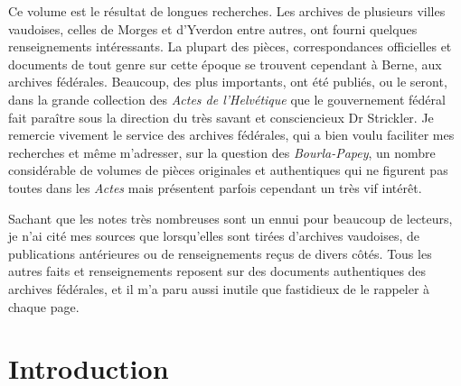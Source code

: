 \documentclass[french,twoside]{book} %
\newcommand\chapteropen{} %
\newcommand\chapterclose{} %
\begin{document}
Ce volume est le résultat de longues recherches. Les archives de plusieurs villes vaudoises, celles de Morges et d’Yverdon entre autres, ont fourni quelques renseignements intéressants. La plupart des pièces, correspondances officielles et documents de tout genre sur cette époque se trouvent cependant à Berne, aux archives fédérales. Beaucoup, des plus importants, ont été publiés, ou le seront, dans la grande collection des \emph{Actes de l’Helvétique} que le gouvernement fédéral fait paraître sous la direction du très savant et consciencieux Dr Strickler. Je remercie vivement le service des archives fédérales, qui a bien voulu faciliter mes recherches et même m’adresser, sur la question des \emph{Bourla-Papey}, un nombre considérable de volumes de pièces originales et authentiques qui ne figurent pas toutes dans les \emph{Actes} mais présentent parfois cependant un très vif intérêt.\par
Sachant que les notes très nombreuses sont un ennui pour beaucoup de lecteurs, je n’ai cité mes sources que lorsqu’elles sont tirées d’archives vaudoises, de publications antérieures ou de renseignements reçus de divers côtés. Tous les autres faits et renseignements reposent sur des documents authentiques des archives fédérales, et il m’a paru aussi inutile que fastidieux de le rappeler à chaque page.
\chapterclose


\chapteropen
\chapter[Introduction]{Introduction}
\end{document}
